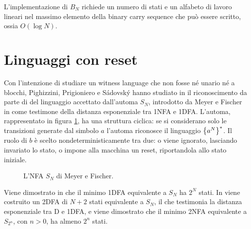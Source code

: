 L'implementazione di $B_N$ richiede un numero di stati e un alfabeto di lavoro lineari nel massimo elemento della binary carry sequence che può essere scritto, ossia $O(\log N)$.



\section{Linguaggi con reset}
Con l'intenzione di studiare un witness language che non fosse né unario né a blocchi, Pighizzini, Prigioniero e Sádovský hanno studiato in \cite{Pighizzini:22:limitedwitness} il riconoscimento da parte di  del linguaggio accettato dall'automa $S_N$, introdotto da Meyer e Fischer in \cite{Meyer:71:ecodescription} come testimone della distanza esponenziale tra 1NFA e 1DFA. L'automa, rappresentato in figura \ref{img:wit:Sn}, ha una struttura ciclica: se si considerano solo le transizioni generate dal simbolo $a$ l'automa riconosce il linguaggio $\left\{ a^N \right\}^*$. Il ruolo di $b$ è scelto nondeterministicamente tra due: o viene ignorato, lasciando invariato lo stato, o impone alla macchina un reset, riportandola allo stato iniziale.

\begin{figure}
	\centering
	
	\caption{L'NFA $S_N$ di Meyer e Fischer.}
	\label{img:wit:Sn}
\end{figure}

Viene dimostrato in \cite{Meyer:71:ecodescription} che il minimo 1DFA equivalente a $S_N$ ha $2^N$ stati. In \cite{Pighizzini:22:limitedwitness} viene costruito un 2DFA di $N+2$ stati equivalente a $S_N$, il che testimonia la distanza esponenziale tra D e 1DFA, e viene dimostrato che il minimo 2NFA equivalente a $S_{2^n}$, con $n>0$, ha almeno $2^n$ stati.

